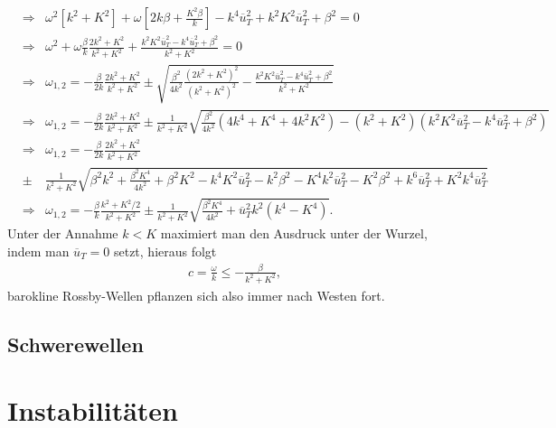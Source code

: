 \documentclass{book}
\newcommand\newoverline[1]{%
\overline{#1}}
\begin{document}
\begin{eqnarray}
&\Rightarrow&\omega^2\left[k^2 + K^2\right] + \omega\left[2k\beta + \frac{K^2\beta}{k}\right] - k^4\newoverline{u}_T^2 + k^2K^2\newoverline{u}_T^2 + \beta^2 = 0\nonumber\\
&\Rightarrow&\omega^2 + \omega\frac{\beta}{k}\frac{2k^2 + K^2}{k^2 + K^2} + \frac{k^2K^2\newoverline{u}_T^2 - k^4\newoverline{u}_T^2 + \beta^2}{k^2 + K^2} = 0\nonumber\\
&\Rightarrow&\omega_{1, 2} = -\frac{\beta}{2k}\frac{2k^2 + K^2}{k^2 + K^2}\pm\sqrt{\frac{\beta^2}{4k^2}\frac{\left(2k^2 + K^2\right)^2}{\left(k^2 + K^2\right)^2} - \frac{k^2K^2\newoverline{u}_T^2 - k^4\newoverline{u}_T^2 + \beta^2}{k^2 + K^2}}\nonumber\\
&\Rightarrow&\omega_{1, 2} = -\frac{\beta}{2k}\frac{2k^2 + K^2}{k^2 + K^2}\pm\frac{1}{k^2 + K^2}\sqrt{\frac{\beta^2}{4k^2}\left(4k^4 + K^4 + 4k^2K^2\right) - \left(k^2 + K^2\right)\left(k^2K^2\newoverline{u}_T^2 - k^4\newoverline{u}_T^2 + \beta^2\right)}\nonumber\\
&\Rightarrow&\omega_{1, 2} = -\frac{\beta}{2k}\frac{2k^2 + K^2}{k^2 + K^2}\nonumber\\
&\pm&\frac{1}{k^2 + K^2}\sqrt{\beta^2k^2 + \frac{\beta^2K^4}{4k^2} + \beta^2K^2 - k^4K^2\newoverline{u}_T^2 - k^2\beta^2 - K^4k^2\newoverline{u}_T^2 - K^2\beta^2 + k^6\newoverline{u}_T^2 + K^2k^4\newoverline{u}_T^2}\nonumber\\
&\Rightarrow&\omega_{1, 2} = -\frac{\beta}{k}\frac{k^2 + K^2/2}{k^2 + K^2}\pm\frac{1}{k^2 + K^2}\sqrt{\frac{\beta^2K^4}{4k^2} + \newoverline{u}_T^2k^2\left(k^4 - K^4\right)}.\label{eq:disp_rel_baroklin}
\end{eqnarray}
%
Unter der Annahme $k<K$ maximiert man den Ausdruck unter der Wurzel, indem man $\newoverline{u}_T = 0$ setzt, hieraus folgt
%
\begin{eqnarray}
c = \frac{\omega}{k}\leq - \frac{\beta}{k^2 + K^2}, 
\end{eqnarray}
%
barokline Rossby-Wellen pflanzen sich also immer nach Westen fort.

\subsection{Schwerewellen}
\label{sec:Schwerewellen}

\section{Instabilitäten}
\label{sec:instabilitaeten}
\end{document}
